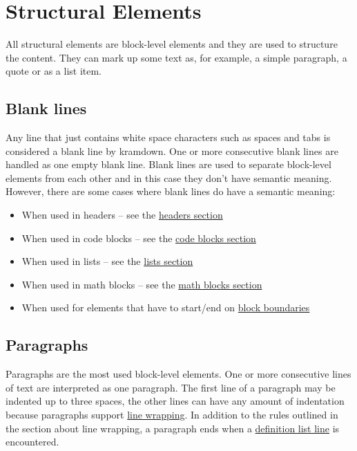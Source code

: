 \documentclass[a4paper]{article}
\begin{document}
\hypertarget{structural-elements}{\section{Structural
Elements}\label{structural-elements}}

All structural elements are block-level elements and they are used to
structure the content. They can mark up some text as, for example, a
simple paragraph, a quote or as a list item.

\hypertarget{blank-lines}{\subsection{Blank lines}\label{blank-lines}}

Any line that just contains white space characters such as spaces and
tabs is considered a blank line by kramdown. One or more consecutive
blank lines are handled as one empty blank line. Blank lines are used to
separate block-level elements from each other and in this case they
don't have semantic meaning. However, there are some cases where blank
lines do have a semantic meaning:

\begin{itemize}
\item
  When used in headers -- see the \protect\hyperlink{headers}{headers
  section}
\item
  When used in code blocks -- see the
  \protect\hyperlink{code-blocks}{code blocks section}
\item
  When used in lists -- see the \protect\hyperlink{lists}{lists section}
\item
  When used in math blocks -- see the
  \protect\hyperlink{math-blocks}{math blocks section}
\item
  When used for elements that have to start/end on
  \protect\hyperlink{block-boundaries}{block boundaries}
\end{itemize}

\hypertarget{paragraphs}{\subsection{Paragraphs}\label{paragraphs}}

Paragraphs are the most used block-level elements. One or more
consecutive lines of text are interpreted as one paragraph. The first
line of a paragraph may be indented up to three spaces, the other lines
can have any amount of indentation because paragraphs support
\protect\hyperlink{line-wrapping}{line wrapping}. In addition to the
rules outlined in the section about line wrapping, a paragraph ends when
a \protect\hyperlink{definition-lists}{definition list line} is
encountered.
\end{document}

